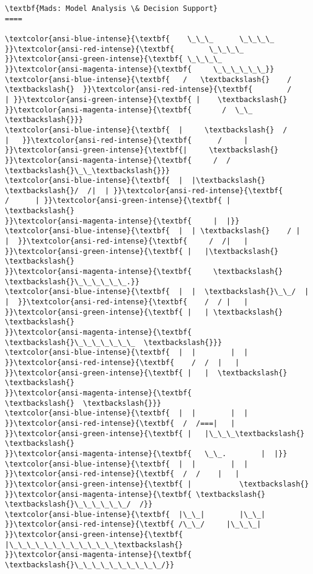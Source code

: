 \documentclass[11pt]{article}
\begin{document}
    \begin{Verbatim}[commandchars=\\\{\}]
\textbf{Mads: Model Analysis \& Decision Support}
====

\textcolor{ansi-blue-intense}{\textbf{    \_\_\_      \_\_\_\_    }}\textcolor{ansi-red-intense}{\textbf{        \_\_\_\_   }}\textcolor{ansi-green-intense}{\textbf{ \_\_\_\_
}}\textcolor{ansi-magenta-intense}{\textbf{     \_\_\_\_\_\_}}
\textcolor{ansi-blue-intense}{\textbf{   /   \textbackslash{}    /    \textbackslash{}  }}\textcolor{ansi-red-intense}{\textbf{        /    | }}\textcolor{ansi-green-intense}{\textbf{ |    \textbackslash{}
}}\textcolor{ansi-magenta-intense}{\textbf{       /  \_\_  \textbackslash{}}}
\textcolor{ansi-blue-intense}{\textbf{  |     \textbackslash{}  /     |   }}\textcolor{ansi-red-intense}{\textbf{      /     |  }}\textcolor{ansi-green-intense}{\textbf{|     \textbackslash{}
}}\textcolor{ansi-magenta-intense}{\textbf{     /  /  \textbackslash{}\_\_\textbackslash{}}}
\textcolor{ansi-blue-intense}{\textbf{  |  |\textbackslash{}  \textbackslash{}/  /|  | }}\textcolor{ansi-red-intense}{\textbf{       /      | }}\textcolor{ansi-green-intense}{\textbf{ |      \textbackslash{}
}}\textcolor{ansi-magenta-intense}{\textbf{     |  |}}
\textcolor{ansi-blue-intense}{\textbf{  |  | \textbackslash{}    / |  |  }}\textcolor{ansi-red-intense}{\textbf{     /  /|   | }}\textcolor{ansi-green-intense}{\textbf{ |   |\textbackslash{}  \textbackslash{}
}}\textcolor{ansi-magenta-intense}{\textbf{     \textbackslash{}  \textbackslash{}\_\_\_\_\_\_.}}
\textcolor{ansi-blue-intense}{\textbf{  |  |  \textbackslash{}\_\_/  |  |  }}\textcolor{ansi-red-intense}{\textbf{    /  / |   | }}\textcolor{ansi-green-intense}{\textbf{ |   | \textbackslash{}  \textbackslash{}
}}\textcolor{ansi-magenta-intense}{\textbf{      \textbackslash{}\_\_\_\_\_\_\_  \textbackslash{}}}
\textcolor{ansi-blue-intense}{\textbf{  |  |        |  | }}\textcolor{ansi-red-intense}{\textbf{    /  /  |   | }}\textcolor{ansi-green-intense}{\textbf{ |   |  \textbackslash{}  \textbackslash{}
}}\textcolor{ansi-magenta-intense}{\textbf{             \textbackslash{}  \textbackslash{}}}
\textcolor{ansi-blue-intense}{\textbf{  |  |        |  |  }}\textcolor{ansi-red-intense}{\textbf{  /  /===|   | }}\textcolor{ansi-green-intense}{\textbf{ |   |\_\_\_\textbackslash{}  \textbackslash{}
}}\textcolor{ansi-magenta-intense}{\textbf{   \_\_.        |  |}}
\textcolor{ansi-blue-intense}{\textbf{  |  |        |  | }}\textcolor{ansi-red-intense}{\textbf{  /  /    |   | }}\textcolor{ansi-green-intense}{\textbf{ |           \textbackslash{}
}}\textcolor{ansi-magenta-intense}{\textbf{ \textbackslash{}  \textbackslash{}\_\_\_\_\_\_/  /}}
\textcolor{ansi-blue-intense}{\textbf{  |\_\_|        |\_\_| }}\textcolor{ansi-red-intense}{\textbf{ /\_\_/     |\_\_\_| }}\textcolor{ansi-green-intense}{\textbf{ |\_\_\_\_\_\_\_\_\_\_\_\_\textbackslash{}
}}\textcolor{ansi-magenta-intense}{\textbf{  \textbackslash{}\_\_\_\_\_\_\_\_\_\_/}}


\end{Verbatim}
\end{document}
